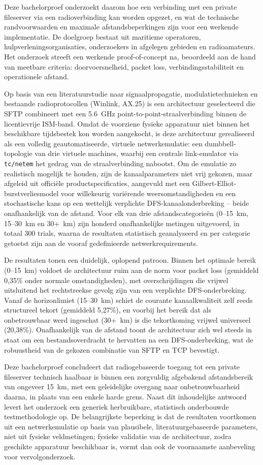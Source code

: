 Deze bachelorproef onderzoekt daarom hoe een verbinding met een private fileserver via
een radioverbinding kan worden opgezet, en wat de technische randvoorwaarden en
maximale afstandsbeperkingen zijn voor een werkende implementatie. De doelgroep bestaat
uit maritieme operatoren, hulpverleningsorganisaties, onderzoekers in afgelegen gebieden
en radioamateurs. Het onderzoek streeft een werkende proof-of-concept na, beoordeeld aan
de hand van meetbare criteria: doorvoersnelheid, packet loss, verbindingsstabiliteit en
operationele afstand.
 
Op basis van een literatuurstudie naar signaalpropagatie, modulatietechnieken en
bestaande radioprotocollen (Winlink, AX.25) is een architectuur geselecteerd die SFTP
combineert met een 5.6~GHz point-to-point-straalverbinding binnen de licentievrije
ISM-band. Omdat de voorziene fysieke apparatuur niet binnen het beschikbare
tijdsbestek kon worden aangekocht, is deze architectuur gerealiseerd als een volledig
geautomatiseerde, virtuele netwerkemulatie: een dumbbell-topologie van drie virtuele
machines, waarbij een centrale link-emulator via \texttt{tc/netem} het gedrag van de
straalverbinding nabootst. Om de emulatie zo realistisch mogelijk te houden, zijn de
kanaalparameters niet vrij gekozen, maar afgeleid uit officiële productspecificaties,
aangevuld met een Gilbert-Elliot-burstverliesmodel voor willekeurig variërende
weersomstandigheden en een stochastische kans op een wettelijk verplichte
DFS-kanaalonderbreking -- beide onafhankelijk van de afstand. Voor elk van drie
afstandscategorieën (0--15~km, 15--30~km en 30+~km) zijn honderd onafhankelijke
metingen uitgevoerd, in totaal 300 trials, waarna de resultaten statistisch
geanalyseerd en per categorie getoetst zijn aan de vooraf gedefinieerde
netwerkrequirements.
 
De resultaten tonen een duidelijk, oplopend patroon. Binnen het optimale bereik
(0--15~km) voldoet de architectuur ruim aan de norm voor packet loss (gemiddeld
0{,}35\% onder normale omstandigheden), met overschrijdingen die vrijwel uitsluitend het
rechtstreekse gevolg zijn van een verplichte DFS-onderbreking. Vanaf de horizonlimiet
(15--30~km) schiet de courante kanaalkwaliteit zelf reeds structureel tekort (gemiddeld
5{,}27\%), en voorbij het bereik dat als onbetrouwbaar werd ingeschat (30+~km) is die
tekortkoming vrijwel universeel (20{,}38\%). Onafhankelijk van de afstand toont de
architectuur zich wel steeds in staat om een bestandsoverdracht te hervatten na een
DFS-onderbreking, wat de robuustheid van de gekozen combinatie van SFTP en TCP
bevestigt.
 
Deze bachelorproef concludeert dat radiogebaseerde toegang tot een private fileserver
technisch haalbaar is binnen een zorgvuldig afgebakend afstandsbereik van ongeveer
15~km, met een geleidelijke overgang naar onbetrouwbaarheid daarna, in plaats van een
enkele harde grens. Naast dit inhoudelijke antwoord levert het onderzoek een generiek
herbruikbare, statistisch onderbouwde testmethodologie op. De belangrijkste beperking
is dat de resultaten voortkomen uit een netwerkemulatie op basis van plausibele,
literatuurgebaseerde parameters, niet uit fysieke veldmetingen; fysieke validatie van de
architectuur, zodra geschikte apparatuur beschikbaar is, vormt dan ook de voornaamste
aanbeveling voor vervolgonderzoek.
